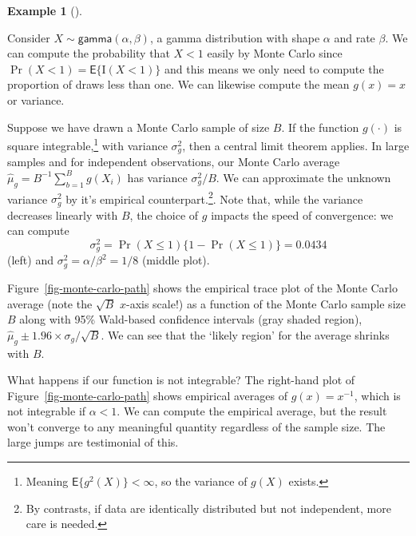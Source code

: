 \documentclass[
  11pt,
  letterpaper,
]{scrbook}
\theoremstyle{definition}
\theoremstyle{definition}
\newtheorem{example}{Example}[chapter]
\theoremstyle{definition}
\theoremstyle{plain}
\theoremstyle{plain}
\theoremstyle{remark}
\begin{document}
\begin{example}[]\protect\hypertarget{exm-expectation-demo}{}\label{exm-expectation-demo}

Consider \(X \sim \mathsf{gamma}(\alpha, \beta)\), a gamma distribution
with shape \(\alpha\) and rate \(\beta\). We can compute the probability
that \(X < 1\) easily by Monte Carlo since
\(\Pr(X <1) = \mathsf{E}\{\mathrm{I}(X<1)\}\) and this means we only
need to compute the proportion of draws less than one. We can likewise
compute the mean \(g(x) = x\) or variance.

Suppose we have drawn a Monte Carlo sample of size \(B\). If the
function \(g(\cdot)\) is square integrable,\footnote{Meaning
  \(\mathsf{E}\{g^2(X)\}<\infty\), so the variance of \(g(X)\) exists.}
with variance \(\sigma^2_g\), then a central limit theorem applies. In
large samples and for independent observations, our Monte Carlo average
\(\widehat{\mu}_g = B^{-1}\sum_{b=1}^B g(X_i)\) has variance
\(\sigma^2_g/B\). We can approximate the unknown variance \(\sigma^2_g\)
by it's empirical counterpart.\footnote{By contrasts, if data are
  identically distributed but not independent, more care is needed.}.
Note that, while the variance decreases linearly with \(B\), the choice
of \(g\) impacts the speed of convergence: we can compute
\[\sigma^2_g =\Pr(X \leq 1)\{1-\Pr(X \leq 1)\}=0.0434\] (left) and
\(\sigma^2_g=\alpha/\beta^2=1/8\) (middle plot).

Figure~\ref{fig-monte-carlo-path} shows the empirical trace plot of the
Monte Carlo average (note the \(\sqrt{B}\) \(x\)-axis scale!) as a
function of the Monte Carlo sample size \(B\) along with 95\% Wald-based
confidence intervals (gray shaded region),
\(\widehat{\mu}_g \pm 1.96 \times \sigma_g/\sqrt{B}\). We can see that
the `likely region' for the average shrinks with \(B\).

What happens if our function is not integrable? The right-hand plot of
Figure~\ref{fig-monte-carlo-path} shows empirical averages of
\(g(x) = x^{-1}\), which is not integrable if \(\alpha < 1\). We can
compute the empirical average, but the result won't converge to any
meaningful quantity regardless of the sample size. The large jumps are
testimonial of this.

\begin{figure}[ht!]

\centering{

}
\end{figure}
\end{example}
\end{document}
